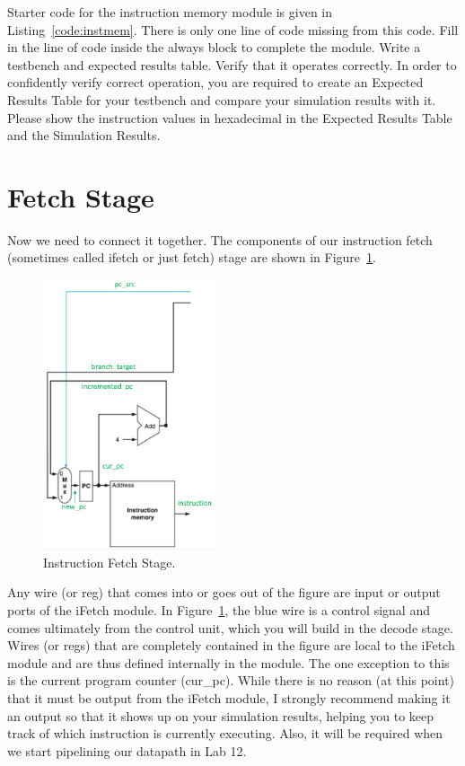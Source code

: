 
Starter code for the instruction memory module is given in Listing~\ref{code:instmem}.  There is only one line of code missing from this code.  Fill in the line of code inside the always block to complete the module.  Write a testbench and expected results table.  Verify that it operates correctly.  In order to confidently verify correct operation, you are required to create an Expected Results Table for your testbench and compare your simulation results with it.  Please show the instruction values in hexadecimal in the Expected Results Table and the Simulation Results.

\section{Fetch Stage}
Now we need to connect it together.  The components of our instruction fetch (sometimes called ifetch or just fetch) stage are shown in Figure~\ref{fig:fetch}.

\begin{figure}
\caption{Instruction Fetch Stage.}\label{fig:fetch}
\begin{center}
\includegraphics[width=2in]{../images/pipeline_fetch.png}
\end{center}
\end{figure}

Any wire (or reg) that comes into or goes out of the figure are input or output ports of the iFetch module.  In Figure~\ref{fig:fetch}, the blue wire is a control signal and comes ultimately from the control unit, which you will build in the decode stage.   Wires (or regs) that are completely contained in the figure are local to the iFetch module and are thus defined internally in the module.  The one exception to this is the current program counter (cur\_pc).  While there is no reason (at this point) that it must be output from the iFetch module, I strongly recommend making it an output so that it shows up on your simulation results, helping you to keep track of which instruction is currently executing.  Also, it will be required when we start pipelining our datapath in Lab 12.

